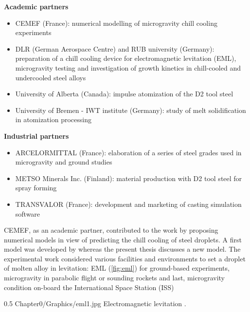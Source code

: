 \textbf{Academic partners} 
 \begin{itemize}
\itemsep0em
\item CEMEF (France): numerical modelling of microgravity chill cooling experiments
\item DLR (German Aerospace Centre) and RUB university (Germany):  preparation of a chill cooling device 
for electromagnetic levitation (EML), microgravity testing and investigation of growth kinetics 
in chill-cooled and undercooled steel alloys
\item University of Alberta (Canada): impulse atomization of the D2 tool steel 
\item University of Bremen - IWT institute (Germany): study of melt solidification in atomization processing
\end{itemize}

\textbf{Industrial partners}
\begin{itemize}
\itemsep0em
\item ARCELORMITTAL (France): elaboration of a series of steel grades used in microgravity and ground studies
\item METSO Minerals Inc.  (Finland): material production with D2 tool steel for spray forming
\item TRANSVALOR (France): development and marketing of casting simulation software \thercast
\end{itemize}

CEMEF, as an academic partner, contributed to the work by proposing numerical models in view of predicting the chill cooling of steel droplets. 
A first model was developed by \citet{rivaux_simulation_2011} whereas the present thesis discusses a new model. 
The experimental work considered various facilities and environments to set a droplet of molten alloy in levitation: 
EML (\cref{fig:eml}) for ground-based experiments, 
microgravity in parabolic flight or sounding rockets and last, microgravity condition on-board the International Space Station (ISS)
\begin{figureth}
{0.5}
{Chapter0/Graphics/eml1.jpg}
{Electromagnetic levitation \citep{dlr_electomagnetic_2014}.}
\label{fig:eml}
\end{figureth}
%
